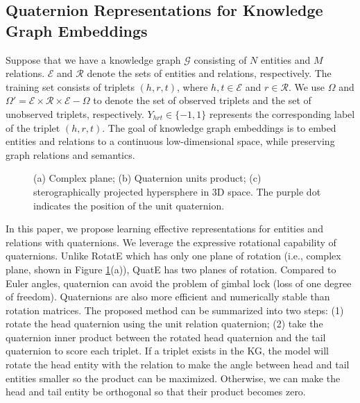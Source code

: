 \documentclass{article}
\begin{document}
\subsection{Quaternion Representations for Knowledge Graph Embeddings}
Suppose that we have a knowledge graph $\mathcal{G}$ consisting of $N$ entities and $M$ relations. $\mathcal{E}$ and $\mathcal{R}$ denote the sets of entities and relations, respectively. The training set consists of triplets $(h, r, t)$, where $h, t \in \mathcal{E}$ and $r \in \mathcal{R}$. We use $\Omega$ and $\Omega' = \mathcal{E} \times \mathcal{R} \times \mathcal{E} - \Omega$ to denote the set of observed triplets and the set of unobserved triplets, respectively. $Y_{hrt} \in \{-1, 1\}$ represents the corresponding label of the triplet $(h, r, t)$. The goal of knowledge graph embeddings is to embed entities and relations to a continuous low-dimensional space, while preserving graph relations and semantics.









\begin{figure}[tbp]
\centering
{}
\quad
{}
\quad
{}
\caption{(a) Complex plane;  (b) Quaternion units product; (c) sterographically projected hypersphere in 3D space. The purple dot indicates the position of the unit quaternion.}
\label{fig:quaternion}
\vspace{-1em}
\end{figure}



In this paper, we propose learning effective representations for entities and relations with quaternions. We leverage the expressive rotational capability of quaternions. Unlike RotatE which has only one plane of rotation (i.e., complex plane, shown in Figure \ref{fig:quaternion}(a)), QuatE has two planes of rotation. Compared to Euler angles, quaternion can avoid the problem of gimbal lock (loss of one degree of freedom). Quaternions are also more efficient and numerically stable than rotation matrices. The proposed method can be summarized into two steps: (1) rotate the head quaternion using the unit relation quaternion; (2) take the quaternion inner product between the rotated head quaternion and the tail quaternion to score each triplet. If a triplet exists in the KG, the model will rotate the head entity with the relation to make the angle between head and tail entities smaller so the product can be maximized. Otherwise, we can make the head and tail entity be orthogonal so that their product becomes zero.
\end{document}
